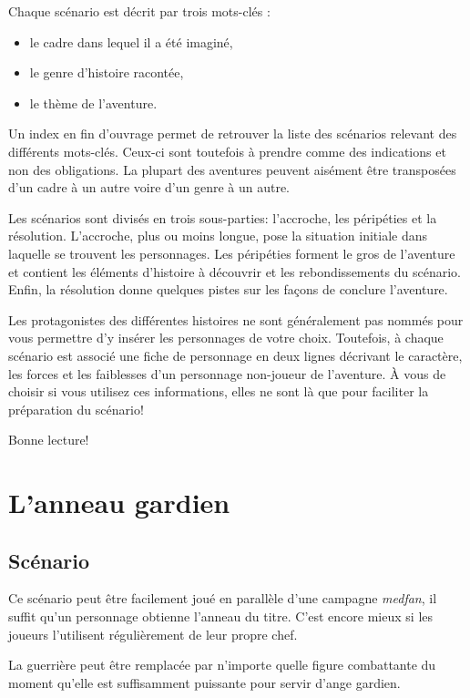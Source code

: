 \documentclass[a5paper,pagesize,10pt,bibliography=totoc,numbers=noenddot,
headings=normal,DIV=9,twoside=false]{scrbook}
\begin{document}
Chaque scénario est décrit par trois mots-clés :
\begin{itemize}
	\item le cadre dans lequel il a été imaginé,
	\item le genre d'histoire racontée,
	\item le thème de l'aventure.
\end{itemize}

Un index en fin d'ouvrage permet de retrouver la liste des scénarios relevant des différents mots-clés.
Ceux-ci sont toutefois à prendre comme des indications et non des obligations.
La plupart des aventures peuvent aisément être transposées d'un cadre à un autre voire d'un genre à un autre.

Les scénarios sont divisés en trois sous-parties: l'accroche, les péripéties et la résolution.
L'accroche, plus ou moins longue, pose la situation initiale dans laquelle se trouvent les personnages.
Les péripéties forment le gros de l'aventure et contient les éléments d'histoire à découvrir et les rebondissements du scénario.
Enfin, la résolution donne quelques pistes sur les façons de conclure l'aventure.

Les protagonistes des différentes histoires ne sont généralement pas nommés pour vous permettre d'y insérer les personnages de votre choix.
Toutefois, à chaque scénario est associé une fiche de personnage en deux lignes décrivant le caractère, les forces et les faiblesses d'un personnage non-joueur de l'aventure.
À vous de choisir si vous utilisez ces informations, elles ne sont là que pour faciliter la préparation du scénario!

Bonne lecture!

\chapter{L'anneau gardien}

\section{Scénario}

Ce scénario peut être facilement joué en parallèle d'une campagne \emph{medfan}, il suffit qu'un personnage obtienne l'anneau du titre.
C'est encore mieux si les joueurs l'utilisent régulièrement de leur propre chef.

La guerrière peut être remplacée par n'importe quelle figure combattante du moment qu'elle est suffisamment puissante pour servir d'ange gardien.
\end{document}
